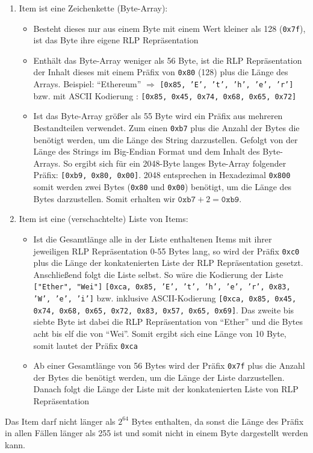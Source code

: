 \documentclass[runningheads]{llncs}
\begin{document}
\begin{enumerate}
  \item Item ist eine Zeichenkette (Byte-Array):
  \begin{itemize}
    \item Besteht dieses nur aus einem Byte mit einem Wert kleiner als 128 (\texttt{0x7f}), ist das Byte ihre eigene RLP Repräsentation
    \item Enthält das Byte-Array weniger als 56 Byte, ist die RLP Repräsentation der Inhalt dieses mit einem Präfix von \texttt{0x80} (128) plus die Länge des Arrays. Beispiel: "`Ethereum"' $\Rightarrow$ \texttt{[0x85, 'E', 't', 'h', 'e', 'r']} bzw. mit ASCII Kodierung : \texttt{[0x85, 0x45, 0x74, 0x68, 0x65, 0x72]}
    \item Ist das Byte-Array größer als 55 Byte wird ein Präfix aus mehreren Bestandteilen verwendet. Zum einen \texttt{0xb7} plus die Anzahl der Bytes die benötigt werden, um die Länge des String darzustellen. Gefolgt von der Länge des Strings im Big-Endian Format und dem Inhalt des Byte-Arrays. So ergibt sich für ein 2048-Byte langes Byte-Array folgender Präfix: \texttt{[0xb9, 0x80, 0x00]}.
    2048 entsprechen in Hexadezimal \texttt{0x800} somit werden zwei Bytes (\texttt{0x80} und \texttt{0x00}) benötigt, um die Länge des Bytes darzustellen. Somit erhalten wir $\texttt{0xb7} + 2 = \texttt{0xb9}$.
  \end{itemize} 
  \item Item ist eine (verschachtelte) Liste von Items:
  \begin{itemize}
    \item Ist die Gesamtlänge alle in der Liste enthaltenen Items mit ihrer jeweiligen RLP Repräsentation 0-55 Bytes lang, so wird der Präfix \texttt{0xc0} plus die Länge der konkatenierten Liste der RLP Repräsentation gesetzt. Anschließend folgt die Liste selbst. So wäre die Kodierung der Liste \texttt{["Ether", "Wei"]} \texttt{[0xca, 0x85, 'E', 't', 'h', 'e', 'r', 0x83, 'W', 'e', 'i']} bzw. inklusive ASCII-Kodierung \texttt{[0xca, 0x85, 0x45, 0x74, 0x68, 0x65, 0x72, 0x83, 0x57, 0x65, 0x69]}. Das zweite bis siebte Byte ist dabei die RLP Repräsentation von "`Ether"' und die Bytes acht bis elf die von "`Wei"'. Somit ergibt sich eine Länge von 10 Byte, somit lautet der Präfix \texttt{0xca}
    \item Ab einer Gesamtlänge von 56 Bytes wird der Präfix \texttt{0x7f} plus die Anzahl der Bytes die benötigt werden, um die Länge der Liste darzustellen. Danach folgt die Länge der Liste mit der konkatenierten Liste von RLP Repräsentation
  \end{itemize}
\end{enumerate}
Das Item darf nicht länger als $2^{64}$ Bytes enthalten, da sonst die Länge des Präfix in allen Fällen länger als 255 ist und somit nicht in einem Byte dargestellt werden kann.
\end{document}

